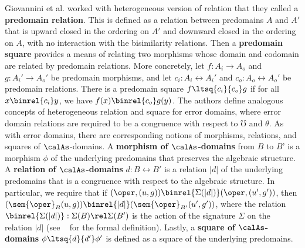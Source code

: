 \documentclass[acmsmall,screen,review,anonymous]{acmart}
\theoremstyle{remark}
\begin{document}
Giovannini et al. worked with heterogeneous version of relation that they called
a \textbf{predomain relation}. This is defined as a relation between predomains
$A$ and $A'$ that is upward closed in the ordering on $A'$ and downward closed
in the ordering on $A$, with no interaction with the bisimilarity relations.
Then a \textbf{predomain square} provides a means of relating two morphisms
whose domain and codomain are related by predomain relations. More concretely,
let $f : A_i \to A_o$ and $g : A_i' \to A_o'$ be predomain morphisms, and let
$c_i : A_i \rel A_i'$ and $c_o : A_o \rel A_o'$ be predomain relations. There is
a predomain square $f \ltsq{c_i}{c_o} g$ if for all $x \binrel{c_i} y$, we have
$f(x) \binrel{c_o} g(y)$.
%
The authors define analogous concepts of heterogeneous relation and square
for error domains, where error domain relations are required to be a congruence
with respect to $\mho$ and $\theta$.
%
As with error domains, there are corresponding notions of morphisms, relations,
and squares of $\calAs$-domains. A \textbf{morphism of $\calAs$-domains} from
$B$ to $B$' is a morphism $\phi$ of the underlying predomains that preserves the
algebraic structure.
A \textbf{relation of $\calAs$-domains} $d : B \rel B'$ is a relation $|d|$ of
the underlying predomains that is a congruence with respect to the algebraic
structure. In particular, we require that
%
if $(\oper, (u, g)) \binrel{\Sigma(|d|)} (\oper, (u', g'))$, then
$(\sem{\oper}_B(u, g)) \binrel{|d|} (\sem{\oper}_{B'}(u', g'))$, where the relation
$\binrel{\Sigma(|d|)} : \Sigma(B) \rel \Sigma(B')$ is the action of the
signature $\Sigma$ on the relation $|d|$ (see \citeappendix~ for the formal
definition).
%
Lastly, a \textbf{square of $\calAs$-domains} $\phi \ltsq{d}{d'} \phi'$ is defined as a
square of the underlying predomains.
\end{document}
